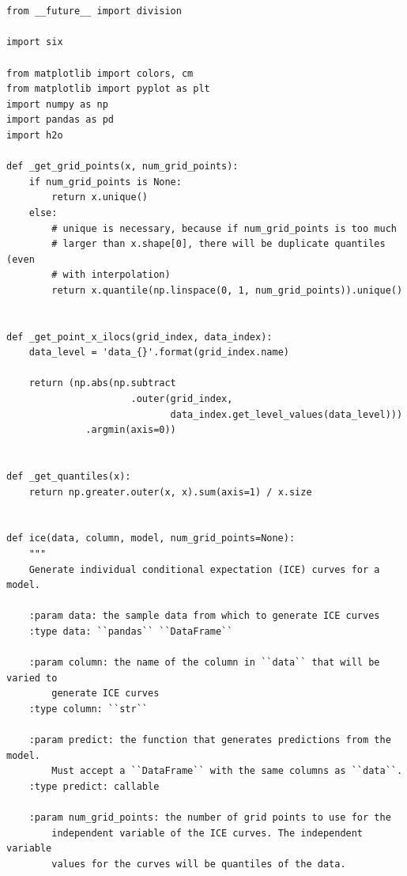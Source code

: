 \documentclass{article}
\begin{document}
\section{} 
\label{sec:App}
\begin{lstlisting}
from __future__ import division

import six

from matplotlib import colors, cm
from matplotlib import pyplot as plt
import numpy as np
import pandas as pd
import h2o

def _get_grid_points(x, num_grid_points):
    if num_grid_points is None:
        return x.unique()
    else:
        # unique is necessary, because if num_grid_points is too much 
        # larger than x.shape[0], there will be duplicate quantiles (even 
        # with interpolation)
        return x.quantile(np.linspace(0, 1, num_grid_points)).unique()


def _get_point_x_ilocs(grid_index, data_index):
    data_level = 'data_{}'.format(grid_index.name)

    return (np.abs(np.subtract
                      .outer(grid_index,
                             data_index.get_level_values(data_level)))
              .argmin(axis=0))


def _get_quantiles(x):
    return np.greater.outer(x, x).sum(axis=1) / x.size


def ice(data, column, model, num_grid_points=None):
    """
    Generate individual conditional expectation (ICE) curves for a model.

    :param data: the sample data from which to generate ICE curves
    :type data: ``pandas`` ``DataFrame``

    :param column: the name of the column in ``data`` that will be varied to
        generate ICE curves
    :type column: ``str``

    :param predict: the function that generates predictions from the model.
        Must accept a ``DataFrame`` with the same columns as ``data``.
    :type predict: callable

    :param num_grid_points: the number of grid points to use for the 
        independent variable of the ICE curves. The independent variable 
        values for the curves will be quantiles of the data.


\end{lstlisting}
\end{document}
